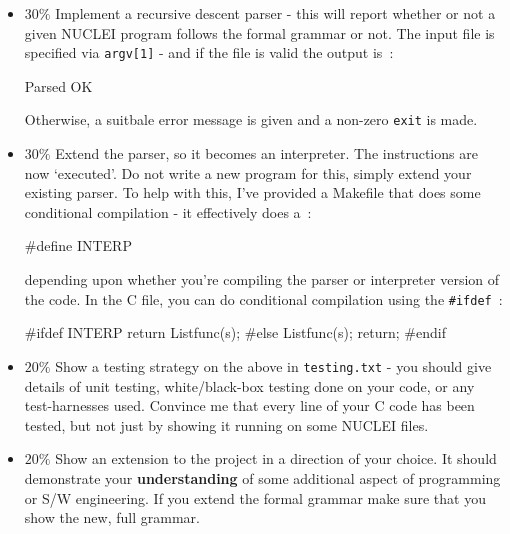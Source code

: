 \begin{exercise}
\begin{itemize}
\item {\bf $30\%$}
Implement a recursive descent parser - this will report
whether or not a given NUCLEI program follows the formal grammar or not.
The input file is specified via \verb^argv[1]^ - and if the file is valid the output is~:
\begin{terminaloutput}
Parsed OK
\end{terminaloutput}
Otherwise, a suitbale error message is given and a non-zero \verb^exit^ is made.

\item {\bf $30\%$}
Extend the parser, so it becomes an interpreter. The instructions are
now `executed'. Do not write a new program for this, simply extend your
existing parser. To help with this, I've provided a Makefile that does
some conditional compilation - it effectively does a~:
\begin{codesnippet}
#define INTERP 
\end{codesnippet}
depending upon whether you're compiling the parser or interpreter version of the code.
In the C file, you can do conditional compilation using the \verb^#ifdef^~:
\begin{codesnippet}
#ifdef INTERP
      return Listfunc(s);
#else
      Listfunc(s);
      return;
#endif
\end{codesnippet}

\item {\bf $20\%$}
Show a testing strategy on the above in \verb^testing.txt^ - you should
give details of unit testing, white/black-box testing done on your code,
or any test-harnesses used.  Convince me that every line of your C code
has been tested, but not just by showing it running on some NUCLEI files.

\item {\bf $20\%$}
Show an extension to the project in a direction of your choice. It should
demonstrate your {\bf understanding} of some additional aspect of programming or
S/W engineering. If you extend the formal grammar make sure that you
show the new, full grammar.

\end{itemize}



\end{exercise}
